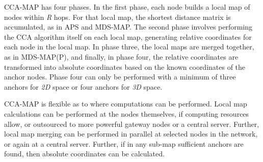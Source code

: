 CCA-MAP has four phases.  In the first phase, each node builds a local map of nodes within \emph{R} hops.  For that local map, the shortest distance matrix is accumulated, as in APS and MDS-MAP.  The second phase involves performing the CCA algorithm itself on each local map, generating relative coordinates for each node in the local map.  In phase three, the local maps are merged together, as in MDS-MAP(P), and finally, in phase four, the relative coordinates are transformed into absolute coordinates based on the known coordinates of the anchor nodes.  Phase four can only be performed with a minimum of three anchors for \emph{2D} space or four anchors for \emph{3D} space.  

CCA-MAP is flexible as to where computations can be performed. Local map calculations can be performed at the nodes themselves, if computing resources allow, or outsourced to more powerful gateway nodes or a central server.  Further, local map merging can be performed in parallel at selected nodes in the network, or again at a central server.  Further, if in any sub-map sufficient anchors are found, then absolute coordinates can be calculated.

